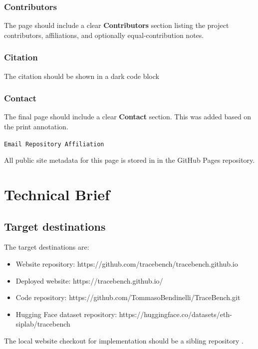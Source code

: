 \documentclass[11pt]{article}
\begin{document}
\subsubsection*{Contributors}

The page should include a clear \textbf{Contributors} section listing the project contributors, affiliations, and optionally equal-contribution notes.

\subsubsection*{Citation}

The citation should be shown in a dark code block

\subsubsection*{Contact}

The final page should include a clear \textbf{Contact} section.
This was added based on the print annotation.
\begin{center}
\texttt{Email \quad Repository \quad Affiliation}
\end{center}

All public site metadata for this page is stored in  in the GitHub Pages repository.

\label{sec:website-technical-brief}
\section*{Technical Brief}

\subsection*{Target destinations}
The target destinations are:
\begin{itemize}
\item Website repository: https://github.com/tracebench/tracebench.github.io
\item Deployed website: https://tracebench.github.io/
\item Code repository: https://github.com/TommasoBendinelli/TraceBench.git
\item Hugging Face dataset repository: https://huggingface.co/datasets/eth-siplab/tracebench
\end{itemize}
The local website checkout for implementation should be a sibling repository .
\end{document}
